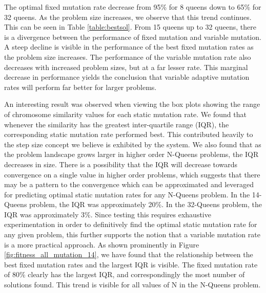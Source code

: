 \documentclass{sig-alternate}
\begin{document}
The optimal fixed mutation rate decrease from 95\% for 8 queens down to 65\% for 32 queens. As the problem size increases, we observe that this trend continues. This can be seen in Table \ref{table:bestsol}. From 15 queens up to 32 queens, there is a divergence between the performance of fixed mutation and variable mutation. A steep decline is visible in the performance of the best fixed mutation rates as the problem size increases. The performance of the variable mutation rate also decreases with increased problem sizes, but at a far lesser rate. This marginal decrease in performance yields the conclusion that variable adaptive mutation rates will perform far better for larger problems.

An interesting result was observed when viewing the box plots showing the range of chromosome similarity values for each static mutation rate. We found that whenever the similarity has the greatest inter-quartile range (IQR), the corresponding static mutation rate performed best. This contributed heavily to the step size concept we believe is exhibited by the system. We also found that as the problem landscape grows larger in higher order N-Queens problems, the IQR decreases in size. There is a possibility that the IQR will decrease towards convergence on a single value in higher order problems, which suggests that there may be a pattern to the convergence which can be approximated and leveraged for predicting optimal static mutation rates for any N-Queens problem. In the 14-Queens problem, the IQR was approximately 20\%. In the 32-Queens problem, the IQR was approximately 3\%. Since testing this requires exhaustive experimentation in order to definitively find the optimal static mutation rate for any given problem, this further supports the notion that a variable mutation rate is a more practical approach. As shown prominently in Figure \ref{fig:fitness_all_mutation_14}, we have found that the relationship between the best fixed mutation rates and the largest IQR is visible. The fixed mutation rate of 80\% clearly has the largest IQR, and correspondingly the most number of solutions found. This trend is visible for all values of N in the N-Queens problem. 
\end{document}
